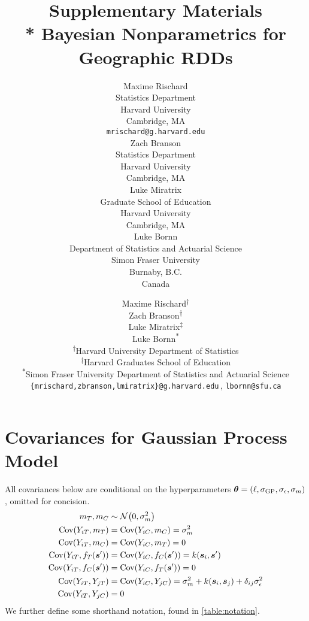 \documentclass{article}
\title{
	\bf
	\Large
	Supplementary Materials
	\\*
    \large
    Bayesian Nonparametrics for Geographic RDDs
}
\author{
  Maxime Rischard \\
  Statistics Department \\
  Harvard University \\
  Cambridge, MA \\
  \texttt{mrischard@g.harvard.edu} \\
  \And
  Zach Branson \\
  Statistics Department \\
  Harvard University \\
  Cambridge, MA \\
  \And
  Luke Miratrix \\
  Graduate School of Education \\
  Harvard University \\
  Cambridge, MA \\
  \And
  Luke Bornn \\
  Department of Statistics and Actuarial Science\\
  Simon Fraser University\\
  Burnaby, B.C.\\
  Canada
}
\author{
Maxime Rischard\textsuperscript{$\dagger$}\\
\And
Zach Branson\textsuperscript{$\dagger$}\\
\And
Luke Miratrix\textsuperscript{$\ddagger$}\\
\And
Luke Bornn\textsuperscript{$\ast$}\\
\AND
\normalfont
\normalsize\textsuperscript{$\dagger$}Harvard University Department of Statistics\\
\normalsize\textsuperscript{$\ddagger$}Harvard Graduates School of Education\\
\normalsize\textsuperscript{$\ast$}Simon Fraser University Department of Statistics and Actuarial Science\\
\texttt{\{mrischard,zbranson,lmiratrix\}@g.harvard.edu}\,, \texttt{lbornn@sfu.ca}
}
\begin{document}

\maketitle

\section{Covariances for Gaussian Process Model}
\label{sec:covariances}
All covariances below are conditional on the hyperparameters \(\bm{\theta} = \left\lparen\ell,\sigma_{\mathrm{GP}}, \sigma_{\epsilon}, \sigma_{m}\right\rparen\), omitted for concision.
\begin{equation}
    \begin{split}
        m_\treat, m_\ctrol   &\sim \normal\del{0,\sigmamu^2} \\
        \cov(Y_{i\treat},m_\treat)  &= \cov(Y_{i\ctrol},m_\ctrol) = \sigmamu^2 \\
        \cov(Y_{i\treat},m_\ctrol)  &= \cov(Y_{i\ctrol},m_\treat)  = 0 \\
        \cov\del{Y_{i\treat}, f_{\treat}(\svec')} &= \cov\del{Y_{i\ctrol}, f_{\ctrol}(\svec')} = k(\svec_i,\svec') \\
        \cov\del{Y_{i\treat}, f_{\ctrol}(\svec')} &= \cov\del{Y_{i\ctrol}, f_{\treat}(\svec')} = 0 \\
        \cov(Y_{i\treat},Y_{j\treat}) &= \cov(Y_{i\ctrol},Y_{j\ctrol}) = \sigmamu^2 + k(\svec_i,\svec_j) + \delta_{ij}\sigman^2 \\
        \cov(Y_{i\treat},Y_{j\ctrol}) &= 0
    \end{split}
    \label{eq:covariances}
\end{equation}
We further define some shorthand notation, found in \autoref{table:notation}.
\end{document}
